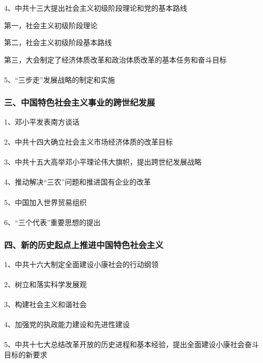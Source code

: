 \documentclass{ctexart}
\begin{document}
4、中共十三大提出社会主义初级阶段理论和党的基本路线

第一，社会主义初级阶段理论

第二，社会主义初级阶段基本路线

第三，大会制定了经济体质改革和政治体质改革的基本任务和奋斗目标
\\\\



5、“三步走”发展战略的制定和实施

\subsubsection{三、中国特色社会主义事业的跨世纪发展}

1、邓小平发表南方谈话
\\\\

2、中共十四大确立社会主义市场经济体质的改革目标
\\\\

3、中共十五大高举邓小平理论伟大旗帜，提出跨世纪发展战略
\\\\

4、推动解决“三农”问题和推进国有企业的改革
\\\\

5、中国加入世界贸易组织
\\\\

6、“三个代表”重要思想的提出

\subsubsection{四、新的历史起点上推进中国特色社会主义}

1、中共十六大制定全面建设小康社会的行动纲领
\\\\

2、树立和落实科学发展观
\\\\

3、构建社会主义和谐社会
\\\\

4、加强党的执政能力建设和先进性建设
\\\\

5、中共十七大总结改革开放的历史进程和基本经验，提出全面建设小康社会奋斗目标的新要求
\end{document}
